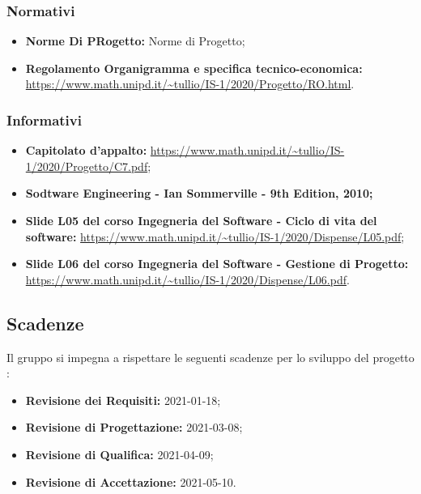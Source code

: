 \subsubsection{Normativi}
\begin{itemize}
\item \textbf{Norme Di PRogetto:} Norme di Progetto;
\item \textbf{Regolamento Organigramma e specifica tecnico-economica:} \url{https://www.math.unipd.it/~tullio/IS-1/2020/Progetto/RO.html}.
\end{itemize}

\subsubsection{Informativi}
\begin{itemize}
\item \textbf{Capitolato d'appalto:} \url{https://www.math.unipd.it/~tullio/IS-1/2020/Progetto/C7.pdf};
\item\textbf{Sodtware Engineering - Ian Sommerville - 9th Edition, 2010;}
\item \textbf{ Slide L05 del corso Ingegneria del Software - Ciclo di vita del software:} \url{https://www.math.unipd.it/~tullio/IS-1/2020/Dispense/L05.pdf};
\item \textbf{Slide L06 del corso Ingegneria del Software - Gestione di Progetto:} \url{https://www.math.unipd.it/~tullio/IS-1/2020/Dispense/L06.pdf}.
\end{itemize}

\subsection{Scadenze}
Il gruppo \Gruppo si impegna a rispettare le seguenti scadenze per lo sviluppo del progetto \NomeProgetto:
\begin{itemize}
\item \textbf{Revisione dei Requisiti:} 2021-01-18;
\item \textbf{Revisione di Progettazione:} 2021-03-08;
\item \textbf{Revisione di Qualifica:} 2021-04-09;
\item \textbf{Revisione di Accettazione:} 2021-05-10.
\end{itemize}